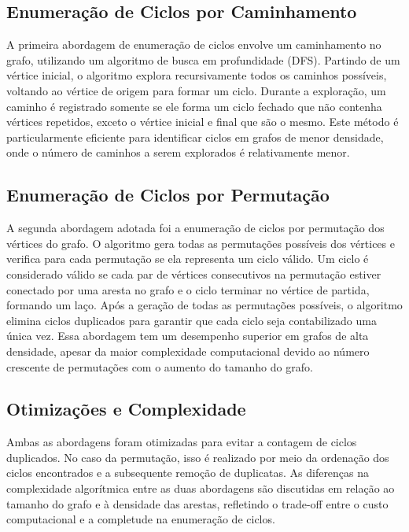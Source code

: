 \documentclass{article}
\begin{document}
\subsection{Enumeração de Ciclos por Caminhamento}

A primeira abordagem de enumeração de ciclos envolve um caminhamento no grafo, utilizando um algoritmo de busca em profundidade (DFS). Partindo de um vértice inicial, o algoritmo explora recursivamente todos os caminhos possíveis, voltando ao vértice de origem para formar um ciclo. Durante a exploração, um caminho é registrado somente se ele forma um ciclo fechado que não contenha vértices repetidos, exceto o vértice inicial e final que são o mesmo. Este método é particularmente eficiente para identificar ciclos em grafos de menor densidade, onde o número de caminhos a serem explorados é relativamente menor.

\subsection{Enumeração de Ciclos por Permutação}

A segunda abordagem adotada foi a enumeração de ciclos por permutação dos vértices do grafo. O algoritmo gera todas as permutações possíveis dos vértices e verifica para cada permutação se ela representa um ciclo válido. Um ciclo é considerado válido se cada par de vértices consecutivos na permutação estiver conectado por uma aresta no grafo e o ciclo terminar no vértice de partida, formando um laço. Após a geração de todas as permutações possíveis, o algoritmo elimina ciclos duplicados para garantir que cada ciclo seja contabilizado uma única vez. Essa abordagem tem um desempenho superior em grafos de alta densidade, apesar da maior complexidade computacional devido ao número crescente de permutações com o aumento do tamanho do grafo.

\subsection{Otimizações e Complexidade}

Ambas as abordagens foram otimizadas para evitar a contagem de ciclos duplicados. No caso da permutação, isso é realizado por meio da ordenação dos ciclos encontrados e a subsequente remoção de duplicatas. As diferenças na complexidade algorítmica entre as duas abordagens são discutidas em relação ao tamanho do grafo e à densidade das arestas, refletindo o trade-off entre o custo computacional e a completude na enumeração de ciclos.
\end{document}
